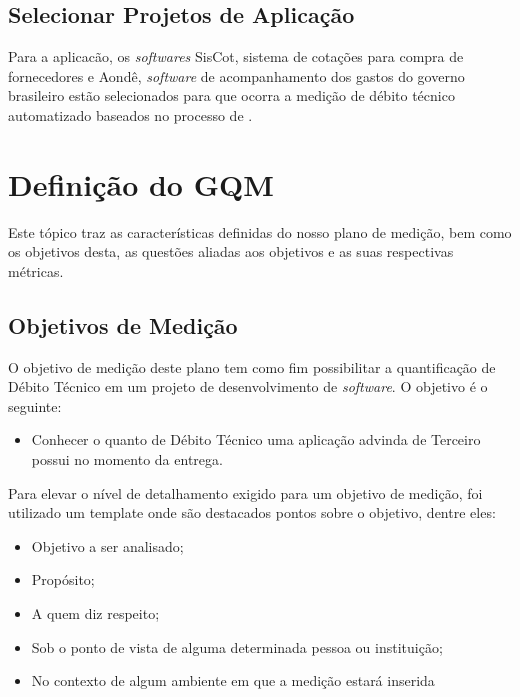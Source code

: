 \subsection{Selecionar Projetos de Aplicação}
Para a aplicacão, os \textit{softwares} SisCot, sistema de cotações para compra de fornecedores e Aondê, \textit{software}
de acompanhamento dos gastos do governo brasileiro estão selecionados para que ocorra a medição
de débito técnico automatizado baseados no processo de \cite{td}.









\section{Definição do GQM}
Este tópico traz as características definidas do nosso plano de medição, bem como
os objetivos desta, as questões aliadas aos objetivos e as suas respectivas métricas.
\subsection{Objetivos de Medição}
O objetivo de medição deste plano tem como fim possibilitar a quantificação de
Débito Técnico em um projeto de desenvolvimento de \textit{software}. O objetivo é o
seguinte:

\begin{itemize}
  \item Conhecer o quanto de Débito Técnico uma aplicação advinda de Terceiro
  possui no momento da entrega.
\end{itemize}

Para elevar o nível de detalhamento exigido para um objetivo de medição, foi
utilizado um template onde são destacados pontos sobre o objetivo, dentre eles:

\begin{itemize}
  \item Objetivo a ser analisado;
  \item Propósito;
  \item A quem diz respeito;
  \item Sob o ponto de vista de alguma determinada pessoa ou instituição;
  \item No contexto de algum ambiente em que a medição estará inserida
\end{itemize}

